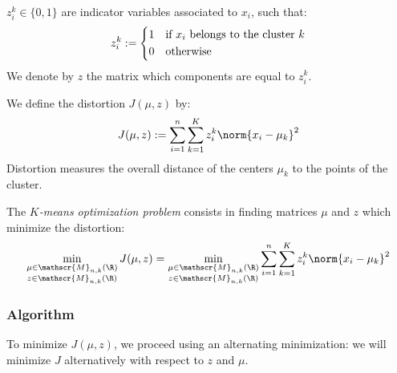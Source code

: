 \documentclass[toc, titlepaged]{../cs-classes/cs-classes}
\begin{document}
\begin{definition}
    $z_i^k\in\{0, 1\}$ are indicator variables associated to $x_i$, such that:
    \begin{equation*}
        z_i^k := \begin{cases*}
            1 & if $x_i$ belongs to the cluster $k$\\
            0 & otherwise
        \end{cases*}
    \end{equation*}
    We denote by $z$ the matrix which components are equal to $z_i^k$.
\end{definition}

\begin{definition}[Distortion]
    We define the distortion $J(\mu, z)$ by:
    \begin{equation}
        J(\mu, z) := \sum_{i=1}^n \sum_{k=1}^K z_i^k \norm{x_i-\mu_k}^2
    \end{equation}
    Distortion measures the overall distance of the centers $\mu_k$ to the points of the cluster.
\end{definition}

\begin{definition}
    The \emph{$K$-means optimization problem} consists in finding matrices $\mu$ and $z$ which minimize the distortion:
    \begin{equation}
        \min_{\substack{\mu\in\mathscr{M}_{n, k}(\R)\\z\in\mathscr{M}_{n, k}(\R)}} J(\mu, z) = \min_{\substack{\mu\in\mathscr{M}_{n, k}(\R)\\z\in\mathscr{M}_{n, k}(\R)}} \sum_{i=1}^n \sum_{k=1}^K z_i^k \norm{x_i-\mu_k}^2
    \end{equation}
\end{definition}

\subsubsection{Algorithm}
To minimize $J(\mu, z)$, we proceed using an alternating minimization: we will minimize $J$ alternatively with respect to $z$ and $\mu$.
\end{document}
